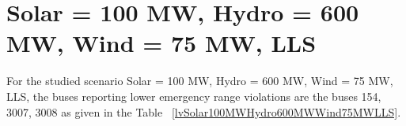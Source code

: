 \documentclass[10pt]{report}
\begin{document}
\section{Solar = 100 MW, Hydro = 600 MW, Wind = 75 MW, LLS}
For the studied scenario Solar = 100 MW, Hydro = 600 MW, Wind = 75 MW, LLS, the buses reporting lower emergency range violations are the buses 154, 3007, 3008 as given in the Table ~\ref{lvSolar100MWHydro600MWWind75MWLLS}.
\begin{table}[H]
\caption{Contingencies reporting bus voltages lower than emergency voltage of 1.1 PU for scenario Solar = 100 MW, Hydro = 600 MW, Wind = 75 MW, LLS}
\label{lvSolar100MWHydro600MWWind75MWLLS}
\centering
{}
\end{table}
\end{document}
